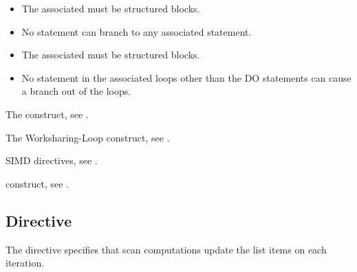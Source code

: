 \begin{ccppspecific}
\begin{itemize}
\item The associated  must be structured blocks.
\item No statement can branch to any associated  statement.
\end{itemize}
\end{ccppspecific}

\begin{fortranspecific}
\begin{itemize}
\item The associated  must be structured blocks.
\item No statement in the associated loops other than the DO statements can cause
      a branch out of the loops.
\end{itemize}
\end{fortranspecific}

\begin{crossrefs}
\item The  construct, see .

\item The Worksharing-Loop construct, see .

\item SIMD directives, see .

\item {} construct, see .
\end{crossrefs}



\subsection{ Directive}
\label{subsec:scan Directive}

\summary
The  directive specifies that scan computations update
the list items on each iteration.

